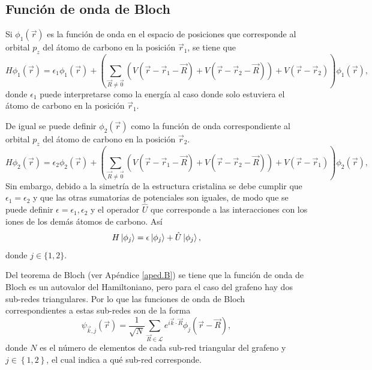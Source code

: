 \subsection{Función de onda de Bloch}
Si $\phi_1(\vec{r})$ es la función de onda en el espacio de posiciones que corresponde al orbital $p_z$ del átomo de carbono en la posición $\vec{r}_1$, se tiene que
\begin{equation}
	H\phi_1(\vec{r}) = \epsilon_1\phi_1(\vec{r}) + \left(\sum_{\vec{R} \neq \vec{0}}\left(V(\vec{r} - \vec{r}_1 - \vec{R})+ V(\vec{r} - \vec{r}_2 - \vec{R})\right) + V(\vec{r}-\vec{r}_2)\right)\phi_1(\vec{r}),
\end{equation}
donde $\epsilon_1$ puede interpretarse como la energía al caso donde solo estuviera el átomo de carbono en la posición $\vec{r}_1$.\par
De igual se puede definir $\phi_2(\vec{r})$ como la función de onda correspondiente al orbital $p_z$ del átomo de carbono en la posición $\vec{r}_2$. 
\begin{equation}
	H\phi_2(\vec{r}) = \epsilon_2\phi_2(\vec{r}) + \left(\sum_{\vec{R} \neq \vec{0}}\left(V(\vec{r} - \vec{r}_1 - \vec{R})+ V(\vec{r} - \vec{r}_2 - \vec{R})\right) + V(\vec{r}-\vec{r}_1)\right)\phi_2(\vec{r}),
\end{equation}
Sin embargo, debido a la simetría de la estructura cristalina se debe cumplir que $\epsilon_1 = \epsilon_2$ y que las otras sumatorias de potenciales son iguales, de modo que se puede definir $\epsilon = \epsilon_1, \epsilon_2$ y el operador $\hat{U}$ que corresponde a las interacciones con los iones de los demás átomos de carbono. Así
\begin{equation}
H \ket{\phi_j} = \epsilon \ket{\phi_j} + \hat{U}\ket{\phi_j},\label{eq:tightapp}
\end{equation}
donde $j \in \{1,2\}$.\par 
Del teorema de Bloch (ver Apéndice \ref{aped.B}) se tiene que la función de onda de Bloch es un autovalor del Hamiltoniano, pero para el caso del grafeno hay dos sub-redes triangulares. Por lo que las funciones de onda de Bloch correspondientes a estas sub-redes son de la forma
\begin{equation}
	\psi_{\vec{k},j}(\vec{r}) = \frac{1}{\sqrt{N}}\sum_{\vec{R}\in \mathcal{L}} e^{i \vec{k}\cdot \vec{R}}\phi_{j}(\vec{r} - \vec{R}),
\end{equation}
donde $N$ es el número de elementos de cada sub-red triangular del grafeno y $j \in \left\{1,2\right\}$, el cual indica a qué sub-red corresponde.\\
